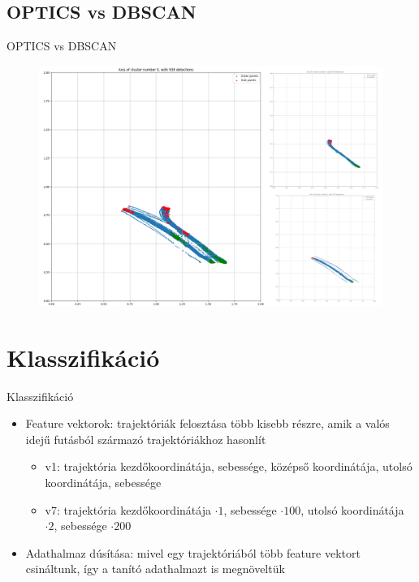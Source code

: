 \documentclass{beamer}
\begin{document}
\subsection{OPTICS vs DBSCAN}
\begin{frame}{OPTICS vs DBSCAN}
    \centering
    \begin{figure}
        \includegraphics[scale=0.2]{../bad_clustering/example_dbscan_vs_optics_merged_cluster.png}
    \end{figure}
\end{frame}

\section{Klasszifikáció}
\begin{frame}{Klasszifikáció}
    \begin{itemize}
        \item Feature vektorok: trajektóriák felosztása több kisebb részre, amik a valós idejű futásból származó trajektóriákhoz hasonlít
        \begin{itemize}
            \item v1: trajektória kezdőkoordinátája, sebessége, középső koordinátája, utolsó koordinátája, sebessége 
            \item v7: trajektória kezdőkoordinátája $\cdot 1$, sebessége $\cdot 100$, utolsó koordinátája $\cdot 2$, sebessége $\cdot 200$
        \end{itemize}
        \item Adathalmaz dúsítása: mivel egy trajektóriából több feature vektort csináltunk, így a tanító adathalmazt is megnöveltük
    \end{itemize}
\end{frame}
\end{document}
